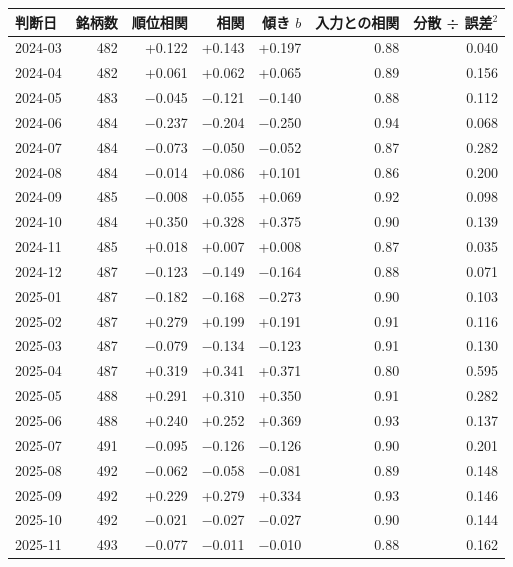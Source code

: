 \begin{tabular}{lrrrrrr}
\toprule
判断日 & 銘柄数 & 順位相関 & 相関 & 傾き $b$ & 入力との相関 & 分散 ÷ 誤差$^2$ \\
\midrule
2024-03 & 482 & +0.122 & +0.143 & +0.197 & 0.88 & 0.040 \\
2024-04 & 482 & +0.061 & +0.062 & +0.065 & 0.89 & 0.156 \\
2024-05 & 483 & \ensuremath{-}0.045 & \ensuremath{-}0.121 & \ensuremath{-}0.140 & 0.88 & 0.112 \\
2024-06 & 484 & \ensuremath{-}0.237 & \ensuremath{-}0.204 & \ensuremath{-}0.250 & 0.94 & 0.068 \\
2024-07 & 484 & \ensuremath{-}0.073 & \ensuremath{-}0.050 & \ensuremath{-}0.052 & 0.87 & 0.282 \\
2024-08 & 484 & \ensuremath{-}0.014 & +0.086 & +0.101 & 0.86 & 0.200 \\
2024-09 & 485 & \ensuremath{-}0.008 & +0.055 & +0.069 & 0.92 & 0.098 \\
2024-10 & 484 & +0.350 & +0.328 & +0.375 & 0.90 & 0.139 \\
2024-11 & 485 & +0.018 & +0.007 & +0.008 & 0.87 & 0.035 \\
2024-12 & 487 & \ensuremath{-}0.123 & \ensuremath{-}0.149 & \ensuremath{-}0.164 & 0.88 & 0.071 \\
2025-01 & 487 & \ensuremath{-}0.182 & \ensuremath{-}0.168 & \ensuremath{-}0.273 & 0.90 & 0.103 \\
2025-02 & 487 & +0.279 & +0.199 & +0.191 & 0.91 & 0.116 \\
2025-03 & 487 & \ensuremath{-}0.079 & \ensuremath{-}0.134 & \ensuremath{-}0.123 & 0.91 & 0.130 \\
2025-04 & 487 & +0.319 & +0.341 & +0.371 & 0.80 & 0.595 \\
2025-05 & 488 & +0.291 & +0.310 & +0.350 & 0.91 & 0.282 \\
2025-06 & 488 & +0.240 & +0.252 & +0.369 & 0.93 & 0.137 \\
2025-07 & 491 & \ensuremath{-}0.095 & \ensuremath{-}0.126 & \ensuremath{-}0.126 & 0.90 & 0.201 \\
2025-08 & 492 & \ensuremath{-}0.062 & \ensuremath{-}0.058 & \ensuremath{-}0.081 & 0.89 & 0.148 \\
2025-09 & 492 & +0.229 & +0.279 & +0.334 & 0.93 & 0.146 \\
2025-10 & 492 & \ensuremath{-}0.021 & \ensuremath{-}0.027 & \ensuremath{-}0.027 & 0.90 & 0.144 \\
2025-11 & 493 & \ensuremath{-}0.077 & \ensuremath{-}0.011 & \ensuremath{-}0.010 & 0.88 & 0.162 \\

\end{tabular}
